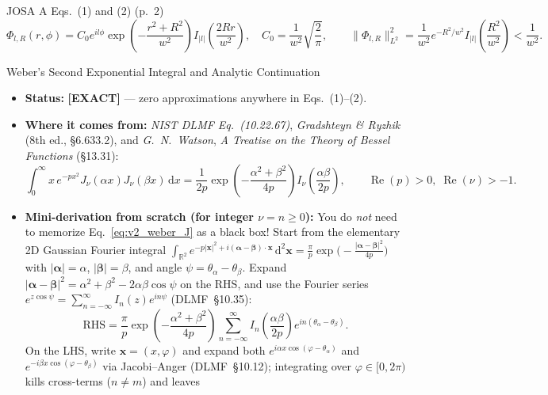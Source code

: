 \documentclass[10pt,letterpaper]{article}
\newcommand{\norm}[1]{\lVert #1 \rVert}
\newcommand{\abs}[1]{\lvert #1 \rvert}
\newcommand{\dd}{\mathrm{d}}
\newcommand{\tagexact}{\textcolor{forest}{\textbf{[EXACT]}}}
\numberwithin{equation}{section}
\begin{document}
\begin{targeteq}{JOSA A Eqs.~(1) and (2) (p.~2)}
\[
  \Phi_{l,R}(r,\phi) = C_0 e^{il\phi}\exp\!\left(-\frac{r^2+R^2}{w^2}\right) I_{\abs{l}}\!\left(\frac{2Rr}{w^2}\right), \quad C_0 = \frac{1}{w^2}\sqrt{\frac{2}{\pi}}, \qquad
  \norm{\Phi_{l,R}}_{L^2}^2 = \frac{1}{w^2} e^{-R^2/w^2} I_{\abs{l}}\!\left(\frac{R^2}{w^2}\right) < \frac{1}{w^2}.
\]
\end{targeteq}

\begin{approxbox}{Weber's Second Exponential Integral and Analytic Continuation}
\begin{itemize}[leftmargin=1.4em,itemsep=2pt,topsep=1pt]
  \item \textbf{Status:} \tagexact{} --- zero approximations anywhere in Eqs.~(1)--(2).
  \item \textbf{Where it comes from:} \emph{NIST DLMF Eq.~(10.22.67)}, \emph{Gradshteyn \& Ryzhik} (8th ed., \S6.633.2), and \emph{G.\ N.\ Watson}, \emph{A Treatise on the Theory of Bessel Functions} (\S13.31):
  \begin{equation}
    \int_0^\infty x\,e^{-p x^2} J_\nu(\alpha x) J_\nu(\beta x)\,\dd x = \frac{1}{2p}\exp\!\left(-\frac{\alpha^2+\beta^2}{4p}\right) I_\nu\!\left(\frac{\alpha\beta}{2p}\right), \qquad \operatorname{Re}(p) > 0,\;\operatorname{Re}(\nu) > -1.
    \label{eq:v2_weber_J}
  \end{equation}
  \item \textbf{Mini-derivation from scratch (for integer $\nu = n \ge 0$):} You do \emph{not} need to memorize Eq.~\eqref{eq:v2_weber_J} as a black box! Start from the elementary 2D Gaussian Fourier integral $\int_{\mathbb{R}^2} e^{-p\abs{\mathbf{x}}^2 + i(\boldsymbol{\alpha}-\boldsymbol{\beta})\cdot\mathbf{x}}\,\dd^2\mathbf{x} = \frac{\pi}{p}\exp\!\bigl(-\frac{\abs{\boldsymbol{\alpha}-\boldsymbol{\beta}}^2}{4p}\bigr)$ with $\abs{\boldsymbol{\alpha}} = \alpha$, $\abs{\boldsymbol{\beta}} = \beta$, and angle $\psi = \theta_\alpha - \theta_\beta$. Expand $\abs{\boldsymbol{\alpha}-\boldsymbol{\beta}}^2 = \alpha^2 + \beta^2 - 2\alpha\beta\cos\psi$ on the RHS, and use the Fourier series $e^{z\cos\psi} = \sum_{n=-\infty}^\infty I_n(z) e^{in\psi}$ (DLMF~\S10.35):
  \[
    \text{RHS} = \frac{\pi}{p}\exp\!\left(-\frac{\alpha^2+\beta^2}{4p}\right)\sum_{n=-\infty}^\infty I_n\!\left(\frac{\alpha\beta}{2p}\right) e^{in(\theta_\alpha - \theta_\beta)}.
  \]
  On the LHS, write $\mathbf{x} = (x,\varphi)$ and expand both $e^{i\alpha x\cos(\varphi-\theta_\alpha)}$ and $e^{-i\beta x\cos(\varphi-\theta_\beta)}$ via Jacobi--Anger (DLMF~\S10.12); integrating over $\varphi \in [0,2\pi)$ kills cross-terms ($n \neq m$) and leaves

\end{itemize}
\end{approxbox}
\end{document}
